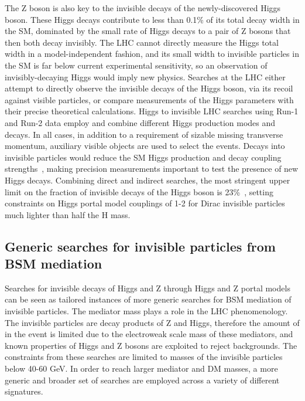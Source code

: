 The Z boson is also key to the invisible decays of the newly-discovered Higgs boson. These Higgs decays contribute to less than 0.1\% of its total decay width in the SM, dominated by the small rate of Higgs decays to a pair of Z bosons that then both decay invisibly. The LHC cannot directly measure the Higgs total width in a model-independent fashion\cite{Dobrescu:2012td}, and its small width to invisible particles in the SM is far below current experimental sensitivity, so an observation of invisibly-decaying Higgs would imply new physics. 
Searches at the LHC either attempt to directly observe the invisible decays of the Higgs boson, via its recoil against visible particles, or compare measurements of the Higgs parameters with their precise theoretical calculations. 
Higgs to invisible LHC searches using Run-1 and Run-2 data employ and combine different Higgs production modes and decays. In all cases, in addition to a requirement of sizable missing transverse momentum, auxiliary visible objects are used to select the events. Decays into invisible particles would reduce the SM Higgs production and decay coupling strengths~\cite{Khachatryan:2016vau,Englert:2011yb,Aad:2015pla}, making precision measurements important to test the presence of new Higgs decays. Combining direct and indirect searches, the most stringent upper limit on the fraction of invisible decays of the Higgs boson is 23\%~\cite{Khachatryan:2016whc,Aad:2015pla}, setting constraints on Higgs portal model couplings of 1-2\‰ for Dirac invisible particles much lighter than half the H mass. 

\subsection{Generic searches for invisible particles from BSM mediation}
\label{sec:results_monoXSearches}

Searches for invisible decays of Higgs and Z through Higgs and Z portal models can be seen as tailored instances of more generic searches for BSM mediation of invisible particles. 
The mediator mass plays a role in the LHC phenomenology. The invisible particles are decay products of Z and Higgs, therefore the amount of \MET in the event is limited due to the electroweak 
scale mass of these mediators, and known properties of Higgs and Z bosons are exploited to reject backgrounds. The constraints from these searches are limited to masses of the invisible particles below 40-60 GeV. In order to reach larger mediator and DM masses, a more generic and broader set of searches are employed across a variety of different signatures. 

